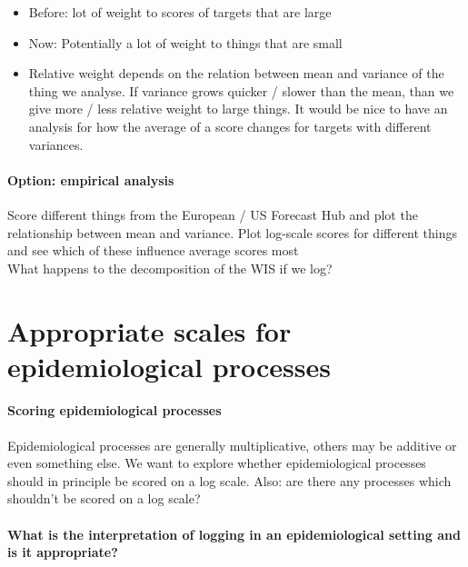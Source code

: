 \documentclass{article}
\begin{document}
\begin{itemize}
    \item Before: lot of weight to scores of targets that are large
    \item Now: Potentially a lot of weight to things that are small
    \item Relative weight depends on the relation between mean and variance of the thing we analyse. If variance grows quicker / slower than the mean, than we give more / less relative weight to large things. It would be nice to have an analysis for how the average of a score changes for targets with different variances. 
\end{itemize}

\paragraph{Option: empirical analysis} 
Score different things from the European / US Forecast Hub and plot the relationship between mean and variance. Plot log-scale scores for different things and see which of these influence average scores most \\
What happens to the decomposition of the WIS if we log? 



\section{Appropriate scales for epidemiological processes}

\paragraph{Scoring epidemiological processes}
Epidemiological processes are generally multiplicative, others may be additive or even something else. We want to explore whether epidemiological processes should in principle be scored on a log scale. Also: are there any processes which shouldn't be scored on a log scale? 

\paragraph{What is the interpretation of logging in an epidemiological setting and is it appropriate?}
\end{document}
